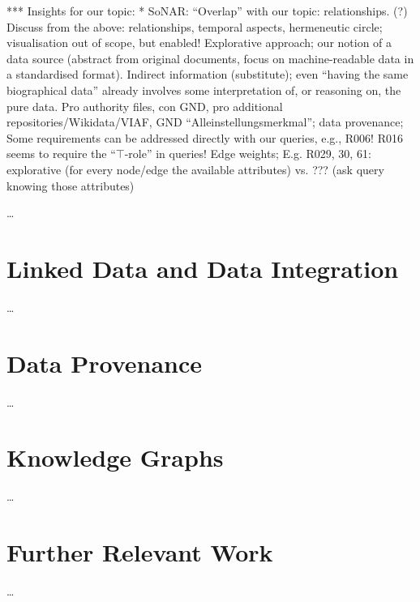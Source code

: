 
*** Insights for our topic:
* SoNAR: 
  \enquote{Overlap} with our topic:
  relationships. (?)
  Discuss from the above: relationships, temporal aspects, hermeneutic circle; visualisation out of scope, but enabled!
  Explorative approach; our notion of a data source (abstract from original documents, focus on machine-readable data in a standardised format).
  Indirect information (substitute); even \enquote{having the same biographical data} already involves some interpretation of, or reasoning on, the pure data.
  Pro authority files, con GND, pro additional repositories/Wikidata/VIAF, GND \enquote{Alleinstellungsmerkmal}; 
  data provenance;
  Some requirements can be addressed directly with our queries, e.g., R006!
  R016 seems to require the \enquote{$\top$-role} in queries!
  Edge weights;
  E.g. R029, 30, 61: explorative (for every node/edge the available attributes) vs. ??? (ask query knowing those attributes)



\dots

\section{Linked Data and Data Integration}
\label{sec:linked_data+integration}

\dots


\section{Data Provenance}
\label{sec:data_provenance}

\dots


\section{Knowledge Graphs}
\label{sec:KGs}

\dots


\section{Further Relevant Work}
\label{sec:further}

\dots


